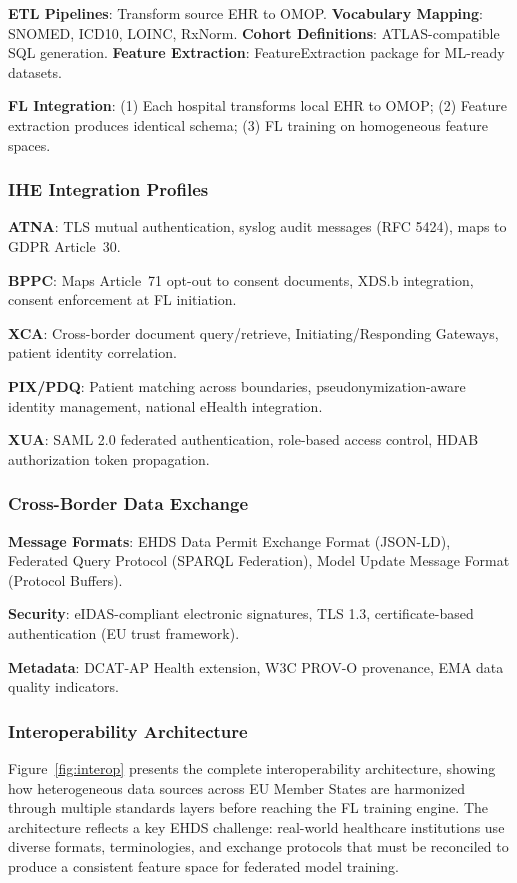 \documentclass[conference]{IEEEtran}
\begin{document}
\textbf{ETL Pipelines}: Transform source EHR to OMOP. \textbf{Vocabulary Mapping}: SNOMED, ICD10, LOINC, RxNorm. \textbf{Cohort Definitions}: ATLAS-compatible SQL generation. \textbf{Feature Extraction}: FeatureExtraction package for ML-ready datasets.

\textbf{FL Integration}: (1) Each hospital transforms local EHR to OMOP; (2) Feature extraction produces identical schema; (3) FL training on homogeneous feature spaces.

\subsubsection{IHE Integration Profiles}

\textbf{ATNA}: TLS mutual authentication, syslog audit messages (RFC 5424), maps to GDPR Article~30.

\textbf{BPPC}: Maps Article~71 opt-out to consent documents, XDS.b integration, consent enforcement at FL initiation.

\textbf{XCA}: Cross-border document query/retrieve, Initiating/Responding Gateways, patient identity correlation.

\textbf{PIX/PDQ}: Patient matching across boundaries, pseudonymization-aware identity management, national eHealth integration.

\textbf{XUA}: SAML 2.0 federated authentication, role-based access control, HDAB authorization token propagation.

\subsubsection{Cross-Border Data Exchange}

\textbf{Message Formats}: EHDS Data Permit Exchange Format (JSON-LD), Federated Query Protocol (SPARQL Federation), Model Update Message Format (Protocol Buffers).

\textbf{Security}: eIDAS-compliant electronic signatures, TLS 1.3, certificate-based authentication (EU trust framework).

\textbf{Metadata}: DCAT-AP Health extension, W3C PROV-O provenance, EMA data quality indicators.

\subsubsection{Interoperability Architecture}

Figure~\ref{fig:interop} presents the complete interoperability architecture, showing how heterogeneous data sources across EU Member States are harmonized through multiple standards layers before reaching the FL training engine. The architecture reflects a key EHDS challenge: real-world healthcare institutions use diverse formats, terminologies, and exchange protocols that must be reconciled to produce a consistent feature space for federated model training.
\end{document}

